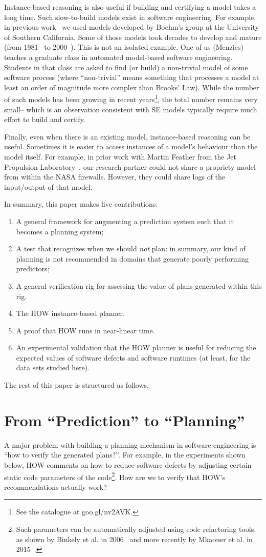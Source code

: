 \documentclass[conference]{IEEEtran}
\newcommand{\be}{\begin{enumerate}}
\newcommand{\ee}{\end{enumerate}}
\begin{document}
Instance-based reasoning is also useful if building and certifying a model   takes a long time. Such slow-to-build models exist in software engineering. For  example, in previous work~\cite{me07f} we used models
developed by Boehm's group at the University of Southern California.
Some of those models took decades to develop and mature (from 1981~\cite{boehm81} to 2000~\cite{boehm00b}).  This is not an isolated example. One of us (Menzies) teaches a graduate class in automated model-based software engineering. 
Students in that class are asked to find (or build) a non-trivial model of
some software process (where ``non-trivial'' means something that processes
a  model at least an order of magnitude more complex than Brooks' Law). 
While the  number of such models has been growing in recent years\footnote{See the
catalogue at goo.gl/nv2AVK.}, 
the total number remains very small-- which is an observation consistent with
SE models typically require  much effort to build and certify.

Finally, even when there is an existing model, instance-based reasoning can be useful.
Sometimes  it is easier to access instances of a model's behaviour than the model
itself. For example, in prior work with Martin  Feather from the Jet Propulsion 
Laboratory~\cite{fea02a},  our research partner could not share a
propriety model from within the NASA firewalls. However, they could share 
logs of the input/output of that model.
 
In summary, this paper makes five contributions:
\be
\item A general framework for augmenting a prediction system such that
it becomes a planning system;
\item A  test that recognizes  when we should {\em not}  plan: in summary, our kind of planning is
not recommended in domains that  generate poorly performing predictors;
\item A general verification rig for assessing the value of plans generated within this rig.
\item The HOW  instance-based planner.
\item A proof that HOW runs in near-linear time.
\item An experimental validation that the HOW planner is useful for reducing the
expected values of software defects and software runtimes (at least, for the data sets studied here).
\ee
The rest of this paper is structured as follows.

 

\section{From ``Prediction'' to ``Planning''}
A major  problem with building a planning mechanism in software engineering is ``how to verify the generated
plans?''. For example,  in the experiments shown below,  HOW comments  on how to reduce
software defects by adjusting certain static code parameters of the code\footnote{Such parameters can be automatically adjusted using code refactoring
tools, as shown by Binkely et al. in 2006~\cite{Binkley2006} and more recently by Mkaouer et al. in 2015~\cite{Mkaouer15}.}. How are we to verify that HOW's recommendations actually work? 
\end{document}
